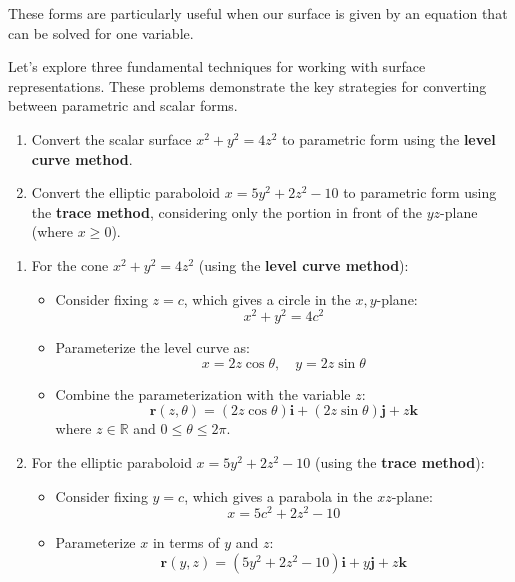 \noindent These forms are particularly useful when our surface is given by an equation that can be solved for one variable.

\exampleline
\begin{example}
Let's explore three fundamental techniques for working with surface representations. These problems demonstrate the key strategies for converting between parametric and scalar forms.

\begin{enumerate}
\item Convert the scalar surface $x^2 + y^2 = 4z^2$ to parametric form using the \textbf{level curve method}.

\item Convert the elliptic paraboloid $x = 5y^2 + 2z^2 - 10$ to parametric form using the \textbf{trace method}, considering only the portion in front of the $yz$-plane (where $x \geq 0$).
\end{enumerate}

\begin{solution}
\begin{enumerate}
\item For the cone $x^2 + y^2 = 4z^2$ (using the \textbf{level curve method}):
   \begin{itemize}
       \item Consider fixing $z = c$, which gives a circle in the $x, y$-plane:
       \[
       x^2 + y^2 = 4c^2
       \]

       \item Parameterize the level curve as:
       \[
       x = 2z\cos\theta, \quad y = 2z\sin\theta
       \]

       \item Combine the parameterization with the variable $z$:
       \[
       \mathbf{r}(z,\theta) = (2z\cos\theta)\mathbf{i} + (2z\sin\theta)\mathbf{j} + z\mathbf{k}
       \]
       where $z \in \mathbb{R}$ and $0 \leq \theta \leq 2\pi$.
   \end{itemize}

\item For the elliptic paraboloid $x = 5y^2 + 2z^2 - 10$ (using the \textbf{trace method}):
   \begin{itemize}
       \item Consider fixing $y = c$, which gives a parabola in the $xz$-plane:
       \[
       x = 5c^2 + 2z^2 - 10
       \]

       \item Parameterize $x$ in terms of $y$ and $z$:
       \[
       \mathbf{r}(y,z) = (5y^2 + 2z^2 - 10)\mathbf{i} + y\mathbf{j} + z\mathbf{k}
       \]


\end{itemize}
\end{enumerate}
\end{solution}
\end{example}
